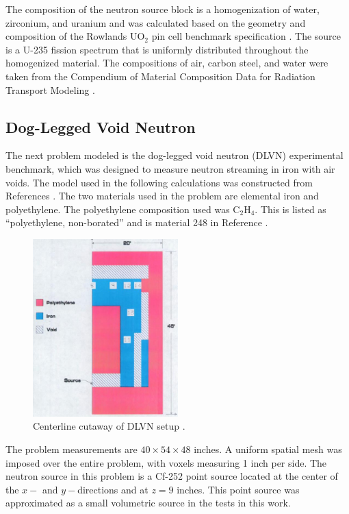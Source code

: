 \documentclass{article} %
\begin{document}
The composition of the neutron source block is a homogenization of water,
zirconium, and uranium and was calculated based on the geometry and composition
of the Rowlands UO$_2$ pin cell benchmark specification \cite{pincell}. The
source is a U-235 fission 
spectrum that is uniformly distributed throughout the homogenized material. The
compositions of air, carbon steel, and water were taken from the Compendium of 
Material Composition Data for Radiation Transport Modeling \cite{pnnl}.

\subsection{Dog-Legged Void Neutron}

The next problem modeled is the dog-legged void neutron (DLVN) experimental 
benchmark, which was designed to measure neutron streaming in iron with air
voids. The model used in the following calculations was constructed from
References \cite{sw-dlvn,j-dlvn,dlvn1991}. The two materials used in the
problem are elemental iron and polyethylene. The polyethylene composition used
was C$_2$H$_4$. This is listed as ``polyethylene, non-borated'' and is material
248 in Reference \cite{pnnl}. 

\begin{figure}[!htb]
\centering
\includegraphics[width=0.5\textwidth]{img/dlvn.png}
\caption{Centerline cutaway of DLVN setup \cite{sw-dlvn}.}
\label{dlvn}
\end{figure}

The problem measurements are $40\times54\times48$ inches. A uniform spatial
mesh was imposed over the entire problem, with voxels measuring 1 inch per
side. The neutron source in this problem is a Cf-252 point source located at
the center of the $x-$ and $y-$directions and at $z = 9$ inches. This point
source was approximated as a small volumetric source in the tests in this
work.
\end{document}
